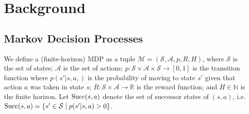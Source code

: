 \documentclass{article}
\newcommand{\bb}[1]{\mathbb{#1}}
\newcommand{\cl}[1]{\mathcal{#1}}
\newcommand{\succc}[2]{\textnormal{Succ}(#1,#2)}
\theoremstyle{plain}
\begin{document}
    
    
    
    
    

\section{Background}
    \subsection{Markov Decision Processes} \label{sec:mdp}
        We define a (finite-horizon) MDP as a tuple $\cl{M}=(\cl{S}, \cl{A}, p, R, H)$, where $\cl{S}$ is the set of states; $\cl{A}$ is the set of actions; $p: \cl{S} \times \cl{A} \times \cl{S} \rightarrow[0,1]$ is the transition function where $p(s'|s,a,)$ is the probability of moving to state $s'$ given that action $a$ was taken in state $s$; $R: \cl{S} \times \cl{A} \rightarrow \bb{R}$ is the reward function; and $H\in\bb{N}$ is the finite horizon. Let $\succc{s}{a}$ denote the set of successor states of $(s,a)$, i.e. $\succc{s}{a}=\{s' \in \cl{S}\mid p(s'|s,a)>0\}$.
        
\end{document}
